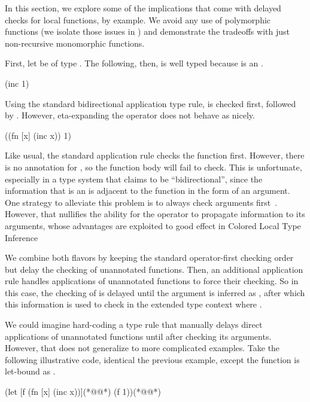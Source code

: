 In this section, we explore some of the implications that come with delayed checks for local functions,
by example.
We avoid any use of polymorphic functions
(we isolate those issues in )
and demonstrate the tradeoffs with just non-recursive monomorphic functions.

First, let  be of type .
The following, then, is well typed because  is an .

\begin{cljlisting}
(inc 1)
\end{cljlisting}

Using the standard bidirectional application type rule,  is checked first,
followed by .
However, eta-expanding the operator does not behave as nicely.

\begin{cljlisting}
((fn [x] (inc x)) 1)
\end{cljlisting}

Like usual, the standard application rule checks the function first.
However, there is no annotation for , so the function body will fail
to check.
This is unfortunate, especially in a type system that claims to be ``bidirectional'',
since the information that  is an  is adjacent to the function
in the form of an argument.
One strategy to alleviate this problem is to always check arguments first~\cite{xie2018let}.
However, that nullifies the ability for the operator to propagate information
to its arguments, whose advantages are exploited to good effect in Colored Local Type Inference~\cite{coloredlti01}

We combine both flavors by keeping the standard operator-first checking order
but delay the checking of unannotated functions.
Then, an additional application rule handles applications of
unannotated functions to force their checking.
So in this case, the checking of 
is delayed until the argument  is inferred as ,
after which this information is used to check 
in the extended type context where .

We could imagine hard-coding a type rule that manually delays
direct applications of unannotated functions until after checking
its arguments.
However, that does not generalize to more complicated examples.
Take the following illustrative code, identical the previous
example, except the function is let-bound as .

{
\lstset{numbers=left}
\begin{cljlisting}
(let [f (fn [x] (inc x))](*@\label{symbolic:example:let-bound:def-f}@*)
  (f 1))(*@\label{symbolic:example:let-bound:app-f}@*)
\end{cljlisting}
}

